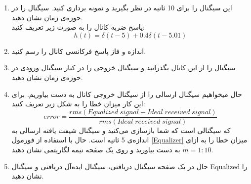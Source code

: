 \documentclass[a4paper]{article}
\begin{document}
\begin{enumerate}
	\item 
این سیگنال را برای 10 ثانیه در نظر بگیرید و نمونه برداری کنید. سیگنال را در حوزه‌ی زمان نشان دهید.
\\
پاسخ ضربه کانال را به صورت زیر تعریف کنید:
\begin{equation}
	h(t) =  \delta(t-5) + 0.4\delta(t-5.01)
\end{equation}
	\item 
اندازه‌ و فاز پاسخ فرکانسی کانال را رسم کنید.

	\item 
سیگنال را از این کانال بگذرانید و سیگنال خروجی را در کنار سیگنال ورودی در حوزه‌ی زمان نشان دهید.
	\item 
حال میخواهیم سیگنال ارسالی را از سیگنال خروجی کانال به دست بیاوریم. برای این کار میزان خطا را به شکل زیر تعریف کنید:
\begin{equation}
	error =  \frac{rms(Equalized \; signal - Ideal \; received \; signal)}{rms( Ideal \; received \; signal)}
\end{equation}
	که 
	سیگنالی است که شما بازسازی می‌کنید و 
	سیگنال شیفت یافته ارسالی به اندازه‌ی 5 ثانیه است.
	حال با استفاده از فورمول \ref{Equalizer} میزان خطا را به ازای 
	$ m = 1:10 $
	به دست بیاورید و روی یک صفحه نیمه لگاریتمی نشان دهید.
	\item
	حال در یک صفحه سیگنال دریافتی، سیگنال ایده‌آل دریافتی و سیگنال   Equalized را نشان دهید.
\end{enumerate}
\end{document}
